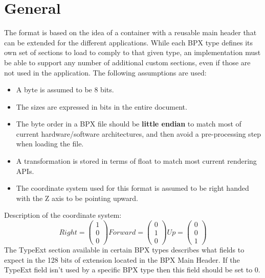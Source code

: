 \section{General}
The format is based on the idea of a container with a reusable main header that can be extended for the different applications. While each BPX type defines its own set of sections to load to comply to that given type, an implementation must be able to support any number of additional custom sections, even if those are not used in the application.\newline
The following assumptions are used:
\begin{itemize}
    \item A byte is assumed to be 8 bits.
    \item The sizes are expressed in bits in the entire document.
    \item The byte order in a BPX file should be \textbf{little endian} to match most of current hardware/software architectures, and then avoid a pre-processing step when loading the file.
    \item A transformation is stored in terms of float to match most current rendering APIs.
    \item The coordinate system used for this format is assumed to be right handed with the Z axis to be pointing upward.
\end{itemize}
Description of the coordinate system:
\begin{equation}
    Right =
    \begin{pmatrix}
        1 \\
        0 \\
        0
    \end{pmatrix}
    Forward =
    \begin{pmatrix}
        0 \\
        1 \\
        0
    \end{pmatrix}
    Up =
    \begin{pmatrix}
        0 \\
        0 \\
        1
    \end{pmatrix}
\end{equation}
The TypeExt section available in certain BPX types describes what fields to expect in the 128 bits of extension located in the BPX Main Header.\newline
If the TypeExt field isn't used by a specific BPX type then this field should be set to 0.

